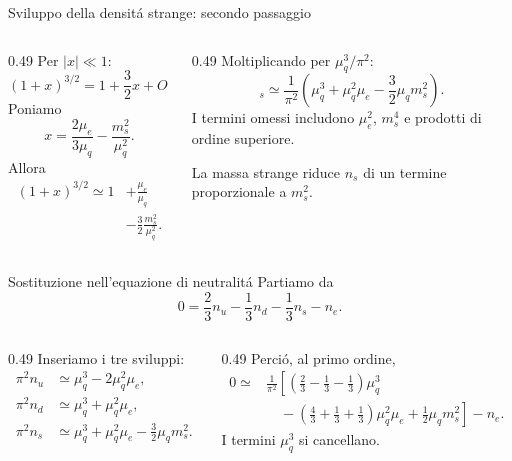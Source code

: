 \begin{frame}[t]{Sviluppo della densit\'a strange: secondo passaggio}
\small
\begin{columns}[T,onlytextwidth]
\begin{column}{0.49\textwidth}
Per $|x|\ll1$:
\[
(1+x)^{3/2}=1+\frac32x+O(x^2).
\]
Poniamo
\[
x=\frac{2\mu_e}{3\mu_q}-\frac{m_s^2}{\mu_q^2}.
\]
Allora
\[
\begin{aligned}
(1+x)^{3/2}\simeq 1
&+\frac{\mu_e}{\mu_q}\\
&-\frac32\frac{m_s^2}{\mu_q^2}.
\end{aligned}
\]
\end{column}
\begin{column}{0.49\textwidth}
Moltiplicando per $\mu_q^3/\pi^2$:
\[
\boxed{
_s\simeq\frac1{\pi^2}
\left(\mu_q^3+\mu_q^2\mu_e
-\frac32\mu_qm_s^2\right)}.
\]
I termini omessi includono $\mu_e^2$, $m_s^4$ e prodotti di ordine superiore.

La massa strange riduce $n_s$ di un termine proporzionale a $m_s^2$.
\end{column}
\end{columns}
\end{frame}

\begin{frame}[t]{Sostituzione nell'equazione di neutralit\'a}
\footnotesize
Partiamo da
\[
0=\frac23n_u-\frac13n_d-\frac13n_s-n_e.
\]
\begin{columns}[T,onlytextwidth]
\begin{column}{0.49\textwidth}
Inseriamo i tre sviluppi:
\[
\begin{aligned}
\pi^2n_u&\simeq\mu_q^3-2\mu_q^2\mu_e,\\
\pi^2n_d&\simeq\mu_q^3+\mu_q^2\mu_e,\\
\pi^2n_s&\simeq\mu_q^3+\mu_q^2\mu_e
-\tfrac32\mu_qm_s^2.
\end{aligned}
\]
\end{column}
\begin{column}{0.49\textwidth}
Perci\'o, al primo ordine,
\[
\begin{aligned}
0\simeq {}&\frac1{\pi^2}
\left[\left(\tfrac23-\tfrac13-\tfrac13\right)\mu_q^3\right.\\
&\left.\quad-\left(\tfrac43+\tfrac13+\tfrac13\right)
\mu_q^2\mu_e
+\tfrac12\mu_qm_s^2\right]-n_e.
\end{aligned}
\]
I termini $\mu_q^3$ si cancellano.
\end{column}
\end{columns}
\end{frame}

